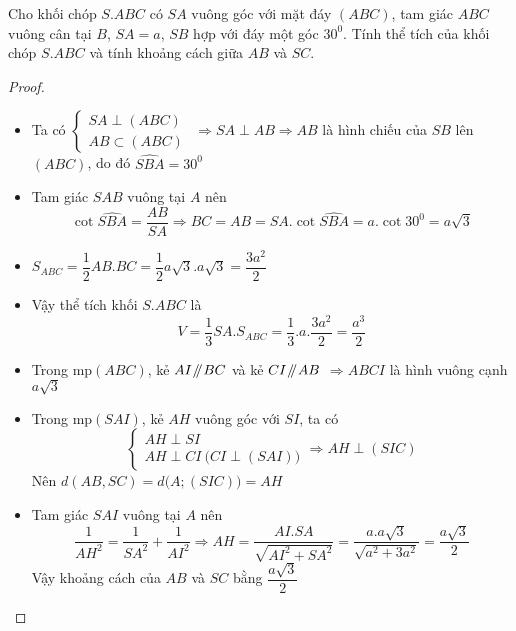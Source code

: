 \begin{dl}
	Cho khối chóp $S.ABC$ có $SA$ vuông góc với mặt đáy $(ABC)$, tam giác $ABC$ vuông cân tại $B$, $SA=a$, $SB$ hợp với đáy một góc $30^0$. Tính thể tích của khối chóp $S.ABC$ và tính khoảng cách giữa $AB$ và $SC$.
\end{dl}
\begin{proof}~
	\begin{center}
		
	\end{center}
	\begin{itemize}
		\item Ta có $\begin{cases}
		SA\perp (ABC)\\ AB\subset (ABC)
		\end{cases}$
		$\Rightarrow SA\perp AB\Rightarrow AB$ là hình chiếu của $SB$ lên $(ABC)$, do đó $\widehat{SBA}=30^0$\\
		\item Tam giác $SAB$ vuông tại $A$ nên $$\cot \widehat{SBA}=\frac{AB}{SA} \Rightarrow BC=AB=SA.\cot\widehat{SBA}
		=a.\cot 30^0=a\sqrt{3}$$
		\item $S_{ABC}=\dfrac{1}{2}AB.BC=\dfrac{1}{2}a\sqrt{3}.a\sqrt{3}=\dfrac{3a^2}{2}$\\[3pt]
		\item Vậy thể tích khối $S.ABC$ là
		$$V=\frac{1}{3}SA.S_{ABC}=\frac{1}{3}.a.\frac{3a^2}{2}=\frac{a^3}{2}$$
		\item Trong mp$(ABC)$, kẻ $AI\mathbin{\!/\mkern-5mu/\!} BC$ và kẻ $CI\mathbin{\!/\mkern-5mu/\!} AB$
		$\Rightarrow ABCI$ là hình vuông cạnh $a\sqrt{3}$\\
		\item Trong mp$(SAI)$, kẻ $AH$ vuông góc với $SI$, ta có
		$$\begin{cases}
		AH\perp SI\\AH\perp CI~\Big(CI\perp (SAI)\Big)
		\end{cases}\Rightarrow AH\perp (SIC)$$
		Nên $d(AB,SC)=d\Big(A;(SIC)\Big)=AH$
		\item Tam giác $SAI$ vuông tại $A$ nên
		$$\frac{1}{AH^2}=\frac{1}{SA^2}+\frac{1}{AI^2}\Rightarrow AH=\frac{AI.SA}{\sqrt{AI^2+SA^2}}=\frac{a.a\sqrt{3}}{\sqrt{a^2+3a^2}}=\frac{a\sqrt{3}}{2}$$
		Vậy khoảng cách của $AB$ và $SC$ bằng $\dfrac{a\sqrt{3}}{2}$
	\end{itemize}
\end{proof}

